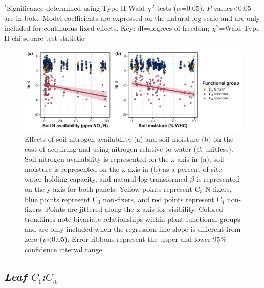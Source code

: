 \begin{singlespace}
    \noindent $^*$Significance determined using Type II Wald $\chi^{2}$ tests ($\alpha$=0.05). \textit{P}-values<0.05 are in bold. Model coefficients are expressed on the natural-log scale and are only included for continuous fixed effects. Key: df=degrees of freedom; $\chi^2$=Wald Type II chi-square test statistic
\end{singlespace}
\clearpage

\newpage
\begin{landscape}
    \begin{figure}
    \centering
    \includegraphics[width=\columnwidth]{ch4_TXeco/figs/TXeco_fig2_beta.jpg}
    \caption[Effects of soil nitrogen availability and soil moisture on the cost of acquiring and using nitrogen relative to water]{Effects of soil nitrogen availability (a) and soil moisture (b) on the cost of acquiring and using nitrogen relative to water ($\beta$; unitless). Soil nitrogen availability is represented on the x-axis in (a), soil moisture is represented on the x-axis in (b) as a percent of site water holding capacity, and natural-log transformed $\beta$ is represented on the y-axis for both panels. Yellow points represent C$_3$ N-fixers, blue points represent C$_3$ non-fixers, and red points represent C$_4$ non-fixers. Points are jittered along the x-axis for visibility. Colored trendlines note bivariate relationships within plant functional groups and are only included when the regression line slope is different from zero (\textit{p}<0.05). Error ribbons represent the upper and lower 95\% confidence interval range.}
    \label{fig:figure4.2}
\end{figure}
\end{landscape}
\clearpage

\subsection{\textit{Leaf $C_\mathrm{i}$:$C_\mathrm{a}$}}
\noindent 

